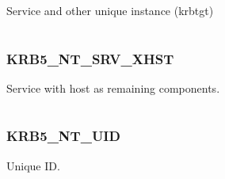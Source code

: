 \documentclass[letterpaper,10pt,english]{sphinxmanual}
\begin{document}
\begin{fulllineitems}
\label{appdev/refs/macros/KRB5_NT_SRV_INST:KRB5_NT_SRV_INST}
\end{fulllineitems}


Service and other unique instance (krbtgt)

\begin{tabulary}{\linewidth}{|L|L|}
\hline

 & 
\\
\hline\end{tabulary}



\subsubsection{KRB5\_NT\_SRV\_XHST}
\label{appdev/refs/macros/KRB5_NT_SRV_XHST:krb5-nt-srv-xhst}\label{appdev/refs/macros/KRB5_NT_SRV_XHST:krb5-nt-srv-xhst-data}\label{appdev/refs/macros/KRB5_NT_SRV_XHST::doc}

\begin{fulllineitems}
\label{appdev/refs/macros/KRB5_NT_SRV_XHST:KRB5_NT_SRV_XHST}
\end{fulllineitems}


Service with host as remaining components.

\begin{tabulary}{\linewidth}{|L|L|}
\hline

 & 
\\
\hline\end{tabulary}



\subsubsection{KRB5\_NT\_UID}
\label{appdev/refs/macros/KRB5_NT_UID:krb5-nt-uid}\label{appdev/refs/macros/KRB5_NT_UID:krb5-nt-uid-data}\label{appdev/refs/macros/KRB5_NT_UID::doc}

\begin{fulllineitems}
\label{appdev/refs/macros/KRB5_NT_UID:KRB5_NT_UID}
\end{fulllineitems}


Unique ID.
\end{document}
